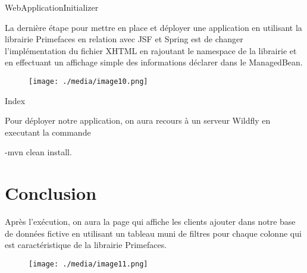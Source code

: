 \documentclass[12pt]{article}
\begin{document}

\par

\begin{Center}
WebApplicationInitializer
\end{Center}\par

La dernière étape pour mettre en place et déployer une application en utilisant la librairie Primefaces en relation avec JSF et Spring est de changer l’implémentation du fichier XHTML en rajoutant le namespace de la librairie et en effectuant un affichage simple des informations déclarer dans le ManagedBean.\par




\begin{figure}[H]
	\begin{Center}
		\texttt{[image: ./media/image10.png]}
	\end{Center}
\end{figure}



\par

\begin{Center}
Index
\end{Center}\par

Pour déployer notre application, on aura recours à un serveur Wildfly en executant la commande\par

-mvn clean install. \par

\section*{Conclusion}
Après l’exécution, on aura la page qui affiche les clients ajouter dans notre base de données fictive en utilisant un tableau muni de filtres pour chaque colonne qui est caractéristique de la librairie Primefaces.\par




\begin{figure}[H]
	\begin{Center}
		\texttt{[image: ./media/image11.png]}
	\end{Center}
\end{figure}



\par


\vspace{\baselineskip}

\printbibliography
\end{document}
